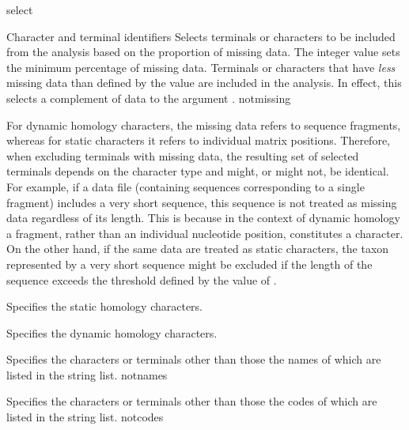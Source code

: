 \begin{command}{select}{}
\begin{arguments}
\begin{argumentgroup}{Character and terminal identifiers}
                {Selects terminals or characters to be included from the analysis
                based on the proportion of missing data. The
                integer value sets the minimum percentage of missing
                data. Terminals or characters that have  \emph{less} missing data
                than defined by the value are included in the analysis.
                In effect, this selects a complement of data to the argument .}
                {notmissing}

                \begin{statement}
                For dynamic homology characters, the missing data refers to
                sequence fragments, whereas for static characters it refers to
                individual matrix positions. Therefore, when excluding
                terminals with missing data, the resulting set of selected
                terminals depends on the character type and might, or
                might not, be identical. For example, if a data file (containing
                sequences corresponding to a single fragment) includes
                a very short sequence, this sequence is not treated as
                missing data regardless of its length. This is because in the
                context of dynamic homology a fragment, rather than an
                individual nucleotide position, constitutes a character.
                On the other hand, if the same data are treated as static characters,
                the taxon represented by a very short sequence
                might be excluded if the length of the sequence exceeds the
                threshold defined by the value of .
                \end{statement}

                {Specifies the static homology characters.}
                {}

                {Specifies the dynamic homology characters.}
                {}

                {Specifies the characters or terminals other than those the
                names of which are listed in the string list.}
                {notnames}

                {Specifies the characters or terminals other than those the
                codes of which are listed in the string list.}
                {notcodes}


\end{argumentgroup}
\end{arguments}
\end{command}
